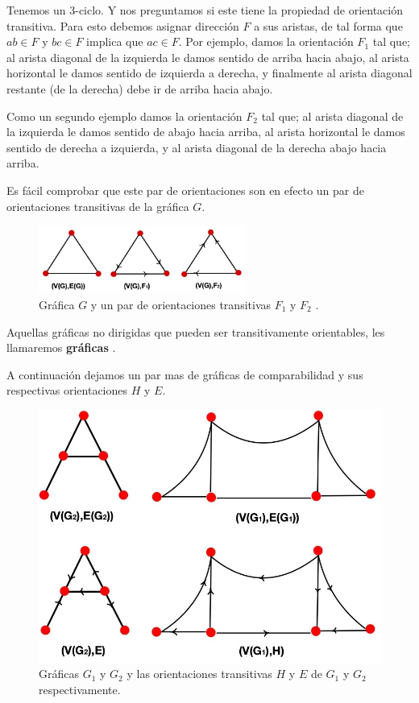 Tenemos un 3-ciclo. Y nos preguntamos si este tiene la propiedad de orientación
transitiva. Para esto debemos asignar dirección $F$ a sus aristas, de tal forma
que $ab\in F$ y $bc\in F$ implica que $ac\in F$. Por ejemplo, damos la
orientación $F_1$ tal que; al arista diagonal de la izquierda le damos sentido
de arriba hacia abajo, al arista horizontal le damos sentido de izquierda a
derecha, y finalmente al arista diagonal restante (de la derecha) debe ir de
arriba hacia abajo.
    
Como un segundo ejemplo damos la orientación $F_2$ tal que; al arista diagonal
de la izquierda le damos sentido de abajo hacia arriba, al arista horizontal le
damos sentido de derecha a izquierda, y al arista diagonal de la derecha abajo
hacia arriba.

Es fácil comprobar que este par de orientaciones son en efecto un par de
orientaciones transitivas de la gráfica $G$.


\begin{figure}[H]
  \centering
  \includegraphics[width=0.6\textwidth]{recursos/capturas/205.jpg}
  \caption{ Gráfica $G$ y un par de orientaciones transitivas $F_1$ y $F_2$ .}
  \label{fig:GrfTrnsOrtbl}
\end{figure}

Aquellas gráficas no dirigidas que pueden ser transitivamente orientables, les
llamaremos \textbf{gráficas} .

A continuación dejamos un par mas de gráficas de comparabilidad y sus
respectivas orientaciones $H$ y $E$.

\begin{figure}[H]
  \centering
  \includegraphics[width=0.6 \textwidth]{recursos/capturas/206.jpg}
  \caption{Gráficas $G_1$ y $G_2$ y las orientaciones transitivas $H$ y $E$ de $G_1$ y $G_2$ respectivamente.}
  \label{fig:206}
\end{figure}

